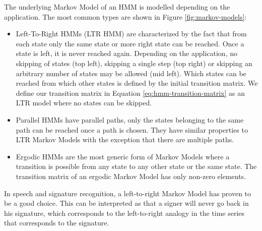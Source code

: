 \documentclass[a4paper, oneside]{csthesis}
\begin{document}
The underlying Markov Model of an HMM is modelled depending on the application. The most common types are shown in Figure \ref{fig:markov-models}:
\begin{itemize}
\item Left-To-Right HMMs (LTR HMM) are characterized by the fact that from each state only the same state or more right state can be reached. Once a state is left, it is never reached again. Depending on the application, no skipping of states (top left), skipping a single step (top right) or skipping an arbitrary number of states may be allowed (mid left). Which states can be reached from which other states is defined by the initial transition matrix. We define our transition matrix in Equation \ref{eq:hmm-transition-matrix} as an LTR model where no states can be skipped.
\item Parallel HMMs have parallel paths, only the states belonging to the same path can be reached once a path is chosen. They have similar properties to LTR Markov Models with the exception that there are multiple paths.
\item Ergodic HMMs are the most generic form of Markov Models where a transition is possible from any state to any other state or the same state. The transition matrix of an ergodic Markov Model has only non-zero elements.
\end{itemize}

In speech and signature recognition, a left-to-right Markov Model has proven to be a good choice. This can be interpreted as that a signer will never go back in his signature, which corresponds to the left-to-right analogy in the time series that corresponds to the signature.
\end{document}
